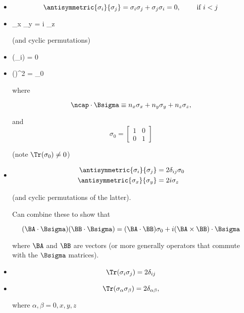 \begin{itemize}
\item 

\begin{equation}\label{eqn:qmTwoL14:n}
\antisymmetric{\sigma_i}{\sigma_j} = \sigma_i \sigma_j + \sigma_j \sigma_i = 0, \qquad \mbox{ if $i < j$}
\end{equation}

\item

\sigma_x \sigma_y = i \sigma_z

(and cyclic permutations)

\item \Tr(\sigma_i) = 0

\item

(\ncap \cdot \Bsigma)^2 = \sigma_0

where 

\begin{equation}\label{eqn:qmTwoL14:n}
\ncap \cdot \Bsigma \equiv n_x \sigma_x + n_y \sigma_y + n_z \sigma_z,
\end{equation}

and
\begin{equation}\label{eqn:qmTwoL14:n}
\sigma_0 = 
\begin{bmatrix}
1 & 0 \\
0 & 1
\end{bmatrix}
\end{equation}

(note $\Tr(\sigma_0) \ne 0$)

\item

\begin{align}\label{eqn:qmTwoL14:n}
\antisymmetric{\sigma_i}{\sigma_j} &= 2 \delta_{ij} \sigma_0 \\
\antisymmetric{\sigma_x}{\sigma_y} &= 2 i \sigma_z
\end{align}

(and cyclic permutations of the latter).

Can combine these to show that 

\begin{equation}\label{eqn:qmTwoL14:n}
(\BA \cdot \Bsigma)
(\BB \cdot \Bsigma)
=
(\BA \cdot \BB) \sigma_0 + i (\BA \times \BB) \cdot \Bsigma
\end{equation}

where $\BA$ and $\BB$ are vectors (or more generally operators that commute with the $\Bsigma$ matrices).

\item

\begin{equation}\label{eqn:qmTwoL14:n}
\Tr(\sigma_i \sigma_j) = 2 \delta_{ij}
\end{equation}

\item

\begin{equation}\label{eqn:qmTwoL14:n}
\Tr(\sigma_\alpha \sigma_\beta) = 2 \delta_{\alpha \beta},
\end{equation}

where $\alpha, \beta = 0, x, y, z$
\end{itemize}


